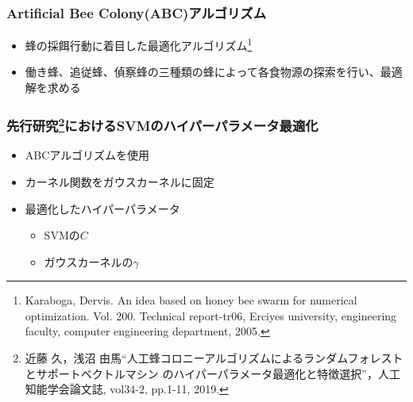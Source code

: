 \documentclass[11pt,dvipdfmx,cjk]{beamer}
\begin{document}
  \begin{frame}
    \frametitle{Artificial Bee Colony(ABC)アルゴリズム}
    \begin{itemize}
      \item 蜂の採餌行動に着目した最適化アルゴリズム\footnote{Karaboga, Dervis. An idea based on honey bee swarm for numerical optimization. Vol. 200. Technical report-tr06, Erciyes university, engineering faculty, computer engineering department, 2005.}
      \item 働き蜂、追従蜂、偵察蜂の三種類の蜂によって各食物源の探索を行い、最適解を求める
    \end{itemize}
  \end{frame}
  \begin{frame}
    \frametitle{先行研究\footnote{近藤 久，浅沼 由馬“人工蜂コロニーアルゴリズムによるランダムフォレストとサポートベクトルマシン
    のハイパーパラメータ最適化と特徴選択”，人工知能学会論文誌, vol34-2, pp.1-11, 2019.}におけるSVMのハイパーパラメータ最適化}
    \begin{itemize}
      \item ABCアルゴリズムを使用
      \item カーネル関数をガウスカーネルに固定
      \item 最適化したハイパーパラメータ
      \begin{itemize}
        \item SVMの$C$
        \item ガウスカーネルの$\gamma$
      \end{itemize}
    \end{itemize}
\end{frame}
\end{document}
